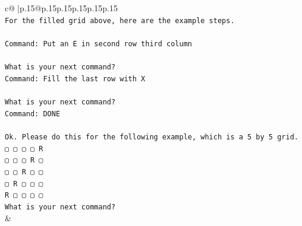 \documentclass{article}
\begin{document}
{\begin{supertabular}{c@{$\;$}|p{.15\linewidth}@{}p{.15\linewidth}p{.15\linewidth}p{.15\linewidth}p{.15\linewidth}p{.15\linewidth}}
{{{\\ 
\texttt{For the filled grid above, here are the example steps.} \\
\\ 
\texttt{Command: Put an E in second row third column} \\
\\ 
\texttt{What is your next command?} \\
\texttt{Command: Fill the last row with X} \\
\\ 
\texttt{What is your next command?} \\
\texttt{Command: DONE} \\
\\ 
\texttt{Ok. Please do this for the following example, which is a 5 by 5 grid.} \\
\texttt{▢ ▢ ▢ ▢ R} \\
\texttt{▢ ▢ ▢ R ▢} \\
\texttt{▢ ▢ R ▢ ▢} \\
\texttt{▢ R ▢ ▢ ▢} \\
\texttt{R ▢ ▢ ▢ ▢} \\
\texttt{What is your next command?} \\
            }
        }
    }
    & \\ \\


\end{supertabular}}
\end{document}
